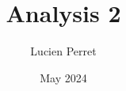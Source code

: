 \documentclass[a4paper, fontsize = 8pt, landscape]{scrartcl}
\title{Analysis 2}
\author{Lucien Perret}
\date{May 2024}
\begin{document}
\begin{multicols}{3}
	\thispagestyle{TitlePageStyle}
	\maketitle
	\raggedcolumns
	
	\raggedcolumns
	
	\raggedcolumns
	
	\raggedcolumns
	
\end{multicols}
\end{document}
